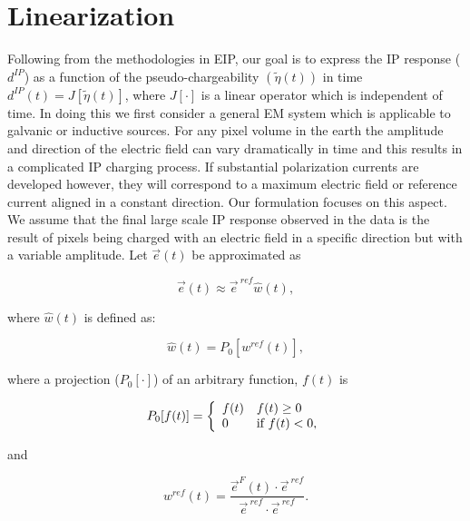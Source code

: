 \documentclass[extra,mreferee]{gji}
\newcommand {\e}  { {\vec e} }
\newcommand{\peta}{\tilde{\eta}}
\newcommand{\eref}{\e^{\ ref}}
\newcommand{\dip}{d^{IP}}
\begin{document}
\section{Linearization}
Following from the methodologies in EIP, our goal is to express the IP response ($\dip$) as a function of the pseudo-chargeability $(\peta(t))$ in time  $\dip(t) = J[\peta(t)]$, where $J[\cdot]$ is a linear operator which is independent of time. In doing this we first consider a general EM system which is applicable to galvanic or inductive sources. 
For any pixel  volume in the earth the amplitude and direction of the  electric field can vary dramatically  in time and this results in a complicated  IP charging process. If substantial polarization currents are developed however, they will correspond to a maximum electric field or reference current aligned in a constant direction. Our formulation focuses on this aspect. We assume that the final large scale IP response observed in the data is the result of  pixels being charged with an electric field in a specific direction but with a variable amplitude. Let $\e(t)$ be approximated as
\begin{linenomath*}
\begin{equation}
  \e(t) \approx \eref \hat{w}(t),
  \label{eq: e_with_eref}
\end{equation}
\end{linenomath*}
where $\hat{w}(t)$ is defined as:
\begin{linenomath*}
\begin{equation}
  \hat{w}(t) = P_0[w^{ref}(t)],
  \label{eq: we}
\end{equation}
\end{linenomath*}
where a projection ($P_0[\cdot]$) of an arbitrary function, $f(t)$ is
\begin{linenomath*}
\begin{equation}
  P_0[f(t)] = \left\{ 
  \begin{array}{l l}
    f(t) & f(t) \ge 0 \\
    0 & \text{if } f(t) < 0, 
  \end{array}\right.
  \label{eq: P0}
\end{equation}
\end{linenomath*}
and
\begin{linenomath*}
\begin{equation}
  w^{ref}(t) = \frac{\e^F(t)\cdot\eref}{\eref\cdot\eref}.
  \label{eq: wref}
\end{equation}
\end{linenomath*}
\end{document}
